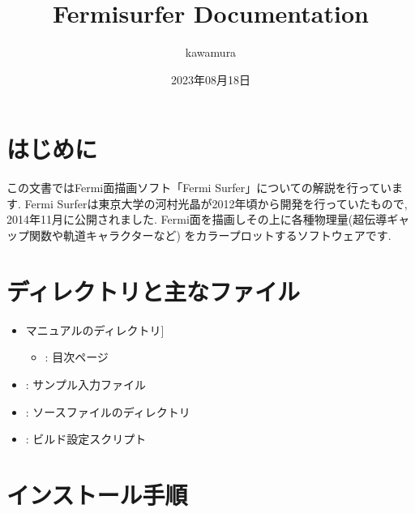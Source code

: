 \documentclass[letterpaper,10pt,dvipdfmx,openany]{sphinxmanual}
\title{Fermisurfer Documentation}
\date{2023年08月18日}
\author{kawamura}
\begin{document}
\pagestyle{empty}
\sphinxmaketitle
\pagestyle{plain}
\sphinxtableofcontents
\pagestyle{normal}
\label{\detokenize{index::doc}}


\sphinxstepscope


\chapter{はじめに}
\label{\detokenize{overview:id1}}\label{\detokenize{overview::doc}}
\sphinxAtStartPar
この文書ではFermi面描画ソフト「Fermi Surfer」についての解説を行っています.
Fermi Surferは東京大学の河村光晶が2012年頃から開発を行っていたもので,
2014年11月に公開されました.
Fermi面を描画しその上に各種物理量(超伝導ギャップ関数や軌道キャラクターなど)
をカラープロットするソフトウェアです.

\sphinxstepscope


\chapter{ディレクトリと主なファイル}
\label{\detokenize{file:id1}}\label{\detokenize{file::doc}}\begin{itemize}
\item {} \begin{description}
\sphinxlineitem{\sphinxcode{\sphinxupquote{doc/}}}{[}マニュアルのディレクトリ{]}\begin{itemize}
\item {} 
\sphinxAtStartPar
{} : 目次ページ

\end{itemize}

\end{description}

\item {} 
\sphinxAtStartPar
{} : サンプル入力ファイル

\item {} 
\sphinxAtStartPar
{} : ソースファイルのディレクトリ

\item {} 
\sphinxAtStartPar
{} : ビルド設定スクリプト

\end{itemize}

\sphinxstepscope


\chapter{インストール手順}
\label{\detokenize{install:id1}}\label{\detokenize{install::doc}}
\end{document}
